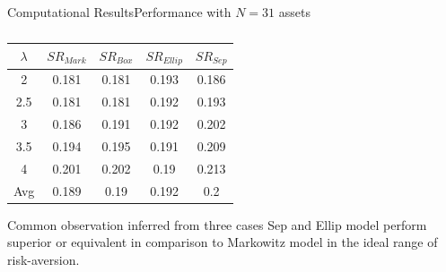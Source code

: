 \documentclass{beamer}
\begin{document}
\begin{frame}{Computational Results}{Performance with $N=31$ assets}
\begin{table}[!h]
    \centering
    \small
    \captionsetup{justification=centering}
  \begin{tabular}{||c|c|c|c|c||}
  \hline
  
  
  $\lambda$ & $SR_{Mark}$ & $SR_{Box}$ & $SR_{Ellip}$ & $SR_{Sep}$ \\
  
  \hline
 2 & 0.181 & 0.181 & 0.193 & 0.186 \\
 2.5 & 0.181 & 0.181 & 0.192 & 0.193 \\
 3 & 0.186 & 0.191 & 0.192 & 0.202 \\
 3.5 & 0.194 & 0.195 & 0.191 & 0.209 \\
 4 & 0.201 & 0.202 & 0.19 & 0.213 \\
  \hline
  Avg & 0.189 & 0.19 & 0.192 & 0.2 \\
  \hline

\end{tabular}
    \caption{}
    \label{tab:1}
\end{table}
\begin{block}{Common observation inferred from three cases}
Sep and Ellip model perform superior or equivalent in comparison to Markowitz model in the ideal range of risk-aversion.
\end{block}
\end{frame}   
\end{document}
